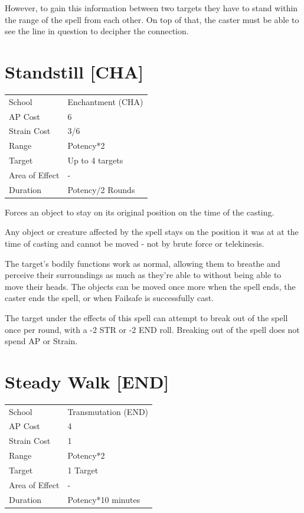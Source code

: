 \documentclass[11pt,a4paper,twocolumn]{book}
\begin{document}
However, to gain this information between two targets they have to stand within the range of the spell from each other. On top of that, the caster must be able to see the line in question to decipher the connection.

\vfill


\section*{Standstill [CHA]}
{
	\begin{tabu} to 75mm{| X[l,4] | X[l,7] |}
		\hline
		School 			& Enchantment (CHA) 		\\
        AP Cost	      	& 6 					\\
        Strain Cost     & 3/6 					\\
        Range     		& Potency*2 			\\
        Target      	& Up to 4 targets		\\
        Area of Effect  & - 	 				\\
        Duration     	& Potency/2 Rounds		\\ \hline
	\end{tabu}
		
}

\medskip

Forces an object to stay on its original position on the time of the casting.

Any object or creature affected by the spell stays on the position it was at at the time of casting and cannot be moved - not by brute force or telekinesis. 

The target's bodily functions work as normal, allowing them to breathe and perceive their surroundings as much as they're able to without being able to move their heads. The objects can be moved once more when the spell ends, the caster ends the spell, or when Failsafe is successfully cast.

The target under the effects of this spell can attempt to break out of the spell once per round, with a -2 STR or -2 END roll. Breaking out of the spell does not spend AP or Strain.


\section*{Steady Walk [END]}
{
	\begin{tabu} to 75mm{| X[l,4] | X[l,7] |}
		\hline
		School 			& Transmutation (END) 	\\
        AP Cost	      	& 4 					\\
        Strain Cost     & 1 					\\
        Range     		& Potency*2 			\\
        Target      	& 1 Target				\\
        Area of Effect  & - 	 				\\
        Duration     	& Potency*10 minutes	\\ \hline
	\end{tabu}
		
}
\end{document}
